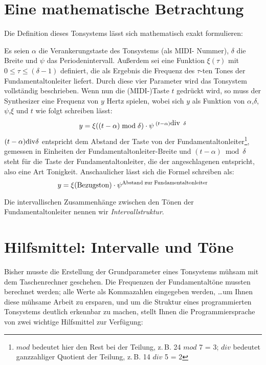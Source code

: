 \begin{center}

\end{center}

\section{Eine mathematische Betrachtung}\label{sec:eine-math-betr}
Die Definition dieses Tonsystems lässt sich mathematisch exakt
formulieren:
\label{MATHE}

Es seien $\alpha$ die Verankerungstaste des Tonsystems (als MIDI-
Nummer), $\delta$ die Breite und $\psi$ das Periodenintervall.
Außerdem sei eine Funktion $\xi ( \tau )$ mit $ 0 \le \tau \le (
\delta - 1 )$ definiert, die als Ergebnis die Frequenz des $\tau$-ten Tones der Fundamentaltonleiter liefert.
Durch diese vier Parameter wird das Tonsystem vollständig
beschrieben. Wenn nun die (MIDI-)Taste $t$ gedrückt wird, so muss der
Synthesizer eine Frequenz von $y$ Hertz spielen, wobei sich $y$ als
Funktion von $\alpha$,$\delta$,$\psi$,$\xi$ und $t$ wie folgt
schreiben lässt:
\[ y= \xi ((t-\alpha) \bmod \delta ) \cdot \psi ^ {\;(t-\alpha )
\mbox{\rm div}\;\; \delta } \]
$ (t-\alpha ) \/{\rm div}\/ \delta $ entspricht dem Abstand der Taste
von der Fundamentaltonleiter\footnote{$mod$ bedeutet hier den Rest bei der Teilung, z.\,B.
24 $mod$ 7 = 3; $div$ bedeutet ganzzahliger Quotient der 
Teilung, z.\,B. 14 $div$ 5 =
2}, gemessen in Einheiten der Fundamentaltonleiter-Breite und
$(t-\alpha) \bmod \delta $ steht für die Taste der Fundamentaltonleiter, die der
angeschlagenen entspricht, also eine Art Tonigkeit.
Anschaulicher lässt sich die Formel schreiben als:
\[ y= \xi ( {\rm Bezugston} ) \cdot \psi ^ {\/{\rm Abstand\;zur\;Fundamentaltonleiter}} \]

Die intervallischen Zusammenhänge zwischen den Tönen der
Fundamentaltonleiter nennen wir \emph{Intervallstruktur}.


\section{Hilfsmittel: Intervalle und Töne}\label{sec:hilfsm-interv-und}
Bisher musste die Erstellung der Grundparameter eines Tonsystems
müh\-sam mit dem Taschenrechner geschehen. Die Frequenzen der
Fundamentaltöne mussten berechnet werden; alle Werte als Kommazahlen
eingegeben werden, \ldots um Ihnen diese mühsame Arbeit zu ersparen,
und um die Struktur eines programmierten Tonsystems deutlich erkennbar
zu machen, stellt Ihnen die Programmiersprache von \mutabor{} zwei
wichtige Hilfsmittel zur Verfügung:

